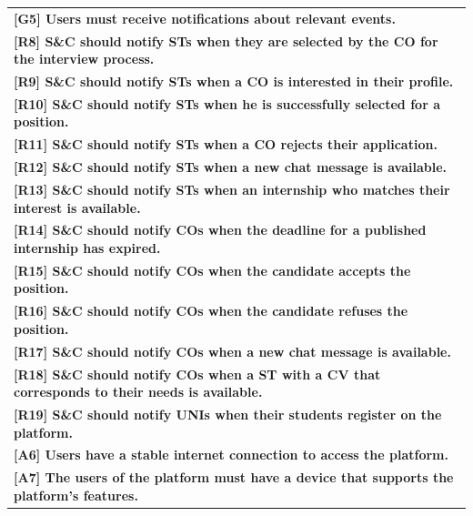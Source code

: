 \begin{center}
    \begin{tabular}{|p{37em}|}
        \rowcolor{bluepoli!40} %
        \hline
        \textbf{[G5] Users must receive notifications about relevant events.} \\
        \rowcolor{bluepoli!15}
        \textbf{[R8] S\&C should notify STs when they are selected by the CO for the interview process.} \\
        \rowcolor{bluepoli!15}
        \textbf{[R9] S\&C should notify STs when a CO is interested in their profile.} \\
        \rowcolor{bluepoli!15}
        \textbf{[R10] S\&C should notify STs when he is successfully selected for a position.} \\
        \rowcolor{bluepoli!15}
        \textbf{[R11] S\&C should notify STs when a CO rejects their application.} \\
        \rowcolor{bluepoli!15}
        \textbf{[R12] S\&C should notify STs when a new chat message is available.} \\
        \rowcolor{bluepoli!15}
        \textbf{[R13] S\&C should notify STs when an internship who matches their interest is available.} \\
        \rowcolor{bluepoli!15}
        \textbf{[R14] S\&C should notify COs when the deadline for a published internship has expired.} \\
        \rowcolor{bluepoli!15}
        \textbf{[R15] S\&C should notify COs when the candidate accepts the position.} \\
        \rowcolor{bluepoli!15}
        \textbf{[R16] S\&C should notify COs when the candidate refuses the position.} \\
        \rowcolor{bluepoli!15}
        \textbf{[R17] S\&C should notify COs when a new chat message is available.} \\
        \rowcolor{bluepoli!15}
        \textbf{[R18] S\&C should notify COs when a ST with a CV that corresponds to their needs is available.} \\
        \rowcolor{bluepoli!15}
        \textbf{[R19] S\&C should notify UNIs when their students register on the platform.} \\
        \textbf{[A6] Users have a stable internet connection to access the platform.}\\
        \textbf{[A7] The users of the platform must have a device that supports the platform's features.}\\
        \hline
    \end{tabular}
\end{center}

